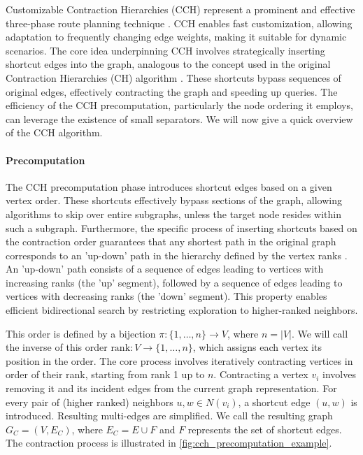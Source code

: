 Customizable Contraction Hierarchies (CCH) represent a prominent and effective three-phase route planning technique \cite{dibbelt_customizable_2016}.
CCH enables fast customization, allowing adaptation to frequently changing edge weights, making it suitable for dynamic scenarios.
The core idea underpinning CCH involves strategically inserting shortcut edges into the graph, analogous to the concept used in the original Contraction Hierarchies (CH) algorithm \cite{geisberger_contraction_2008}.
These shortcuts bypass sequences of original edges, effectively contracting the graph and speeding up queries.
The efficiency of the CCH precomputation, particularly the node ordering it employs, can leverage the existence of small separators.
We will now give a quick overview of the CCH algorithm.

\paragraph{Precomputation}

The CCH precomputation phase introduces shortcut edges based on a given vertex order.
These shortcuts effectively bypass sections of the graph, allowing algorithms to skip over entire subgraphs, unless the target node resides within such a subgraph.
Furthermore, the specific process of inserting shortcuts based on the contraction order guarantees that any shortest path in the original graph corresponds to an 'up-down' path in the hierarchy defined by the vertex ranks \cite{geisberger_contraction_2008}.
An 'up-down' path consists of a sequence of edges leading to vertices with increasing ranks (the 'up' segment), followed by a sequence of edges leading to vertices with decreasing ranks (the 'down' segment).
This property enables efficient bidirectional search by restricting exploration to higher-ranked neighbors.

This order is defined by a bijection \( \pi : \{1, \dots, n\} \to V \), where \( n = |V| \).
We will call the inverse of this order \( \text{rank} : V \to \{1, \dots, n\} \), which assigns each vertex its position in the order.
The core process involves iteratively contracting vertices in order of their rank, starting from rank 1 up to \( n \).
Contracting a vertex \( v_i \) involves removing it and its incident edges from the current graph representation.
For every pair of (higher ranked) neighbors \( u, w \in N(v_i) \), a shortcut edge \( (u, w) \) is introduced.
Resulting multi-edges are simplified.
We call the resulting graph \( G_C = (V, E_C) \), where \( E_C = E \cup F \) and \( F \) represents the set of shortcut edges.
The contraction process is illustrated in \cref{fig:cch_precomputation_example}.

